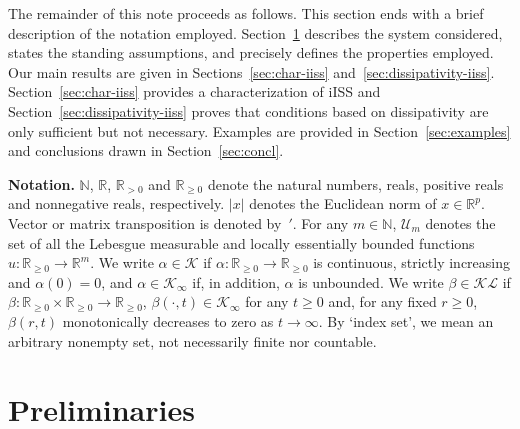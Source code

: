 \documentclass[9pt,final,journal]{IEEEtran}
\def\K{\mathcal{K}}
\def\Ki{\K_{\infty}}
\def\KL{\mathcal{KL}}
\def\R{\mathbb{R}}
\def\N{\mathbb{N}}
\def\U{\mathcal{U}}
\begin{document}
% 
% 


The remainder of this note proceeds as follows. This section ends with a brief description of the notation employed. Section~\ref{sec:prel} describes the system considered, states the standing assumptions, and precisely defines the properties employed. Our main results are given in Sections~\ref{sec:char-iiss} and~\ref{sec:dissipativity-iiss}. Section~\ref{sec:char-iiss} provides a characterization of iISS and Section~\ref{sec:dissipativity-iiss} proves that conditions based on dissipativity are only sufficient but not necessary. Examples are provided in Section~\ref{sec:examples} and conclusions drawn in Section~\ref{sec:concl}.

\textbf{Notation.} $\N$, $\R$, $\R_{>0}$ and $\R_{\ge 0}$ denote the natural numbers, reals, positive reals and nonnegative reals, respectively. $|x|$ denotes the Euclidean norm of $x \in \R^p$. Vector or matrix transposition is denoted by~$'$. For any $m\in \N$, $\U_m$ denotes the set of all the Lebesgue measurable and locally essentially bounded functions $u:\R_{\ge 0}\to \R^m$. We write $\alpha\in\K$ if $\alpha:\R_{\ge 0} \to \R_{\ge 0}$ is continuous, strictly 
increasing and $\alpha(0)=0$, and $\alpha\in\Ki$ if, in addition, $\alpha$ is unbounded. We write $\beta\in\KL$ if $\beta:\R_{\ge 0}\times \R_{\ge 0}\to \R_{\ge 0}$, $\beta(\cdot,t)\in\Ki$ for any $t\ge 0$ and, for any fixed $r\ge 0$, $\beta(r,t)$ monotonically decreases to zero as $t\to \infty$. By `index set', we mean an arbitrary nonempty set, not necessarily finite nor countable.


\section{Preliminaries}
\label{sec:prel}
\end{document}
